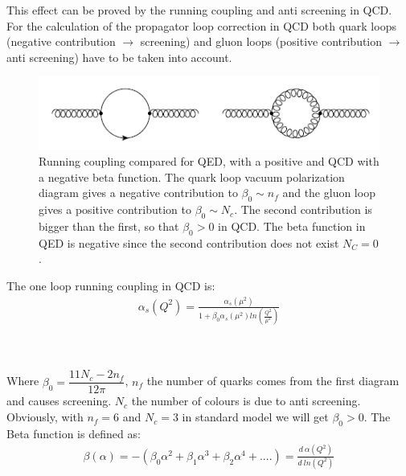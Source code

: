 This effect can be proved by the running coupling and anti screening in QCD.
For the calculation of the propagator loop correction in QCD both quark loops (negative contribution $ \rightarrow $ screening) and gluon loops (positive contribution $ \rightarrow $ anti screening) have to be taken into account. 
\begin{figure}[h!]
\centering
\includegraphics[scale=0.7]{images/Intro/quarkGluonPop.png}
\caption{Running coupling compared for QED, with a positive and QCD with a negative beta function. The quark loop vacuum polarization diagram gives a negative contribution
to $\beta_0 \sim n_f$ and the gluon loop gives a positive contribution to $\beta_0 \sim N_c$. The second contribution is bigger than the first, so that $ \beta_0 > 0 $ in QCD. The beta function in QED is negative since the second contribution does not exist $ N_C=0 $.}
\end{figure}

The one loop running coupling in QCD is:
\begin{equation}
\begin{split}
\alpha_s(Q^2)= \frac{\alpha_s(\mu^2)}{1+\beta_0 \alpha_s(\mu^2) ln(\frac{Q^2}{\mu^2})}
\end{split}
\end{equation}
\\
\\
\pagebreak

Where $ \beta_0 = \dfrac{11N_c -2n_f}{12\pi} $, $ n_f $ the number of quarks comes from the first diagram and causes screening.  $ N_c $ the number of colours is due to anti screening. Obviously, with $ n_f = 6 $ and $ N_c = 3 $ in standard model we will get $ \beta_0 >0 $. The Beta function is defined as:
\begin{equation}
\begin{split}
\beta(\alpha)=-(\beta_0 \alpha^2 + \beta_1 \alpha^3+\beta_2\alpha^4+....)=\frac{d\:\alpha(Q^2)}{d \:ln(Q^2)}
\end{split}
\end{equation}

